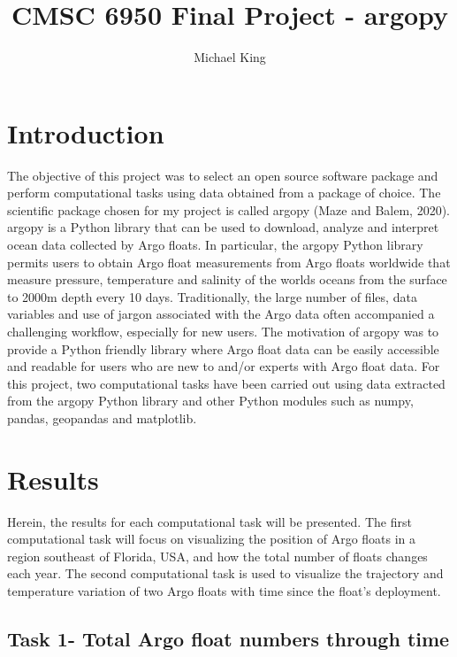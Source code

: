 \documentclass{article}
\title{CMSC 6950 Final Project - argopy}
\author{Michael King}
\begin{document}
\maketitle

\section{Introduction}

The objective of this project was to select an open source software package and perform computational tasks using data obtained from a package of choice. The scientific package chosen for my project is called argopy (Maze and Balem, 2020). argopy is a Python library that can be used to download, analyze and interpret ocean data collected by Argo floats. In particular, the argopy Python library permits users to obtain Argo float measurements from Argo floats worldwide that measure pressure, temperature and salinity of the worlds oceans from the surface to 2000m depth every 10 days. Traditionally, the large number of files, data variables and use of jargon associated with the Argo data often accompanied a challenging workflow, especially for new users. The motivation of argopy was to provide a Python friendly library where Argo float data can be easily accessible and readable for users who are new to and/or experts with Argo float data. For this project, two computational tasks have been carried out using data extracted from the argopy Python library and other Python modules such as numpy, pandas, geopandas and matplotlib. 

    

\section{Results}

Herein, the results for each computational task will be presented. The first computational task will focus on visualizing the position of Argo floats in a region southeast of Florida, USA,  and how the total number of floats changes each year. The second computational task is used to visualize the trajectory and temperature variation of two Argo floats with time since the float's deployment.

\subsection{Task 1- Total Argo float numbers through time}
\end{document}
